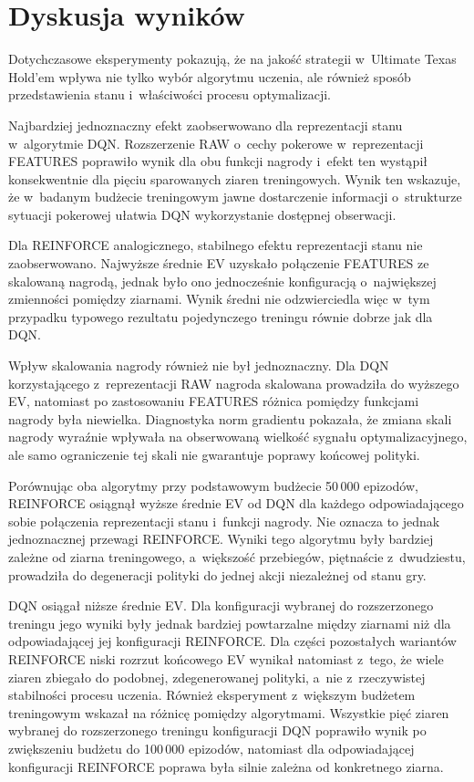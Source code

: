 \section{Dyskusja wyników}
\label{sec:dyskusja-wynikow}

Dotychczasowe eksperymenty pokazują, że na jakość strategii
w~Ultimate Texas Hold'em wpływa nie tylko wybór algorytmu uczenia,
ale również sposób przedstawienia stanu i~właściwości procesu
optymalizacji.

Najbardziej jednoznaczny efekt zaobserwowano dla reprezentacji stanu
w~algorytmie DQN. Rozszerzenie RAW o~cechy pokerowe w~reprezentacji FEATURES
poprawiło wynik dla obu funkcji nagrody i~efekt ten wystąpił
konsekwentnie dla pięciu sparowanych ziaren treningowych. Wynik ten
wskazuje, że w~badanym budżecie treningowym jawne dostarczenie
informacji o~strukturze sytuacji pokerowej ułatwia DQN wykorzystanie
dostępnej obserwacji.

Dla REINFORCE analogicznego, stabilnego efektu reprezentacji stanu
nie zaobserwowano. Najwyższe średnie EV uzyskało połączenie FEATURES
ze skalowaną nagrodą, jednak było ono jednocześnie konfiguracją
o~największej zmienności pomiędzy ziarnami. Wynik średni nie
odzwierciedla więc w~tym przypadku typowego rezultatu pojedynczego
treningu równie dobrze jak dla DQN.

Wpływ skalowania nagrody również nie był jednoznaczny. Dla DQN
korzystającego z~reprezentacji RAW nagroda skalowana prowadziła do
wyższego EV, natomiast po zastosowaniu FEATURES różnica pomiędzy
funkcjami nagrody była niewielka. Diagnostyka norm gradientu
pokazała, że zmiana skali nagrody wyraźnie wpływała na obserwowaną
wielkość sygnału optymalizacyjnego, ale samo ograniczenie tej skali nie
gwarantuje poprawy końcowej polityki.

Porównując oba algorytmy przy podstawowym budżecie 50\,000 epizodów,
REINFORCE osiągnął wyższe średnie EV od DQN dla każdego
odpowiadającego sobie połączenia reprezentacji stanu i~funkcji
nagrody. Nie oznacza to jednak jednoznacznej przewagi REINFORCE.
Wyniki tego algorytmu były bardziej zależne od ziarna treningowego,
a~większość przebiegów, piętnaście z~dwudziestu, prowadziła do
degeneracji polityki do jednej akcji niezależnej od stanu gry.

DQN osiągał niższe średnie EV. Dla konfiguracji wybranej do
rozszerzonego treningu jego wyniki były jednak bardziej powtarzalne
między ziarnami niż dla odpowiadającej jej konfiguracji REINFORCE. Dla
części pozostałych wariantów REINFORCE niski rozrzut końcowego EV
wynikał natomiast z~tego, że wiele ziaren zbiegało do podobnej,
zdegenerowanej polityki, a~nie z~rzeczywistej stabilności procesu uczenia.
Również eksperyment z~większym budżetem treningowym
wskazał na różnicę pomiędzy algorytmami. Wszystkie pięć ziaren wybranej
do rozszerzonego treningu konfiguracji DQN poprawiło wynik po
zwiększeniu budżetu do 100\,000 epizodów, natomiast dla odpowiadającej
konfiguracji REINFORCE poprawa była silnie zależna od konkretnego
ziarna.

